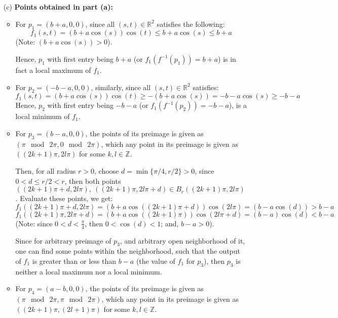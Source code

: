 \documentclass{article}
\begin{document}
\begin{itemize}
    \hfil

    \item[(c)] \textbf{Points obtained in part (a):}
    \begin{itemize}
        \item For $p_1=(b+a,0,0)$, since all $(s,t)\in\mathbb{R}^2$ satisfies the following:
        $$f_1(s,t)=(b+a\cos(s))\cos(t) \leq b+a\cos(s) \leq b+a$$
        (Note: $(b+a\cos(s))>0$).

        Hence, $p_1$ with first entry being $b+a$ (or $f_1(f^{-1}(p_1))=b+a$) is in fact a local maximum of $f_1$.

        \hfil

        \item For $p_2=(-b-a,0,0)$, similarly, since all $(s,t)\in\mathbb{R}^2$ satisfies:
        $$f_1(s,t)=(b+a\cos(s))\cos(t) \geq -(b+a\cos(s)) = -b-a\cos(s) \geq -b-a$$
        Hence, $p_2$ with first entry being $-b-a$ (or $f_1(f^{-1}(p_2)) = -b-a$), is a local minimum of $f_1$.

        \hfil

        \item For $p_3 = (b-a,0,0)$, the points of its preimage is given as $(\pi\mod\ 2\pi, 0\mod\ 2\pi)$, 
        which any point in its preimage is given as $((2k+1)\pi, 2l\pi)$ for some $k,l\in\mathbb{Z}$.

        Then, for all radius $r>0$, choose $d=\min\{\pi/4, r/2\}>0$, since $0<d\leq r/2<r$, then both points $((2k+1)\pi+d, 2l\pi),\ ((2k+1)\pi, 2l\pi+d)\in B_r((2k+1)\pi, 2l\pi)$.
        Evaluate these points, we get:
        $$f_1((2k+1)\pi+d, 2l\pi) =(b+a\cos((2k+1)\pi+d))\cos(2l\pi) = (b-a\cos(d)) > b-a$$
        $$f_1((2k+1)\pi, 2l\pi+d)=(b+a\cos((2k+1)\pi))\cos(2l\pi +d) = (b-a)\cos(d) < b-a$$
        (Note: since $0<d<\frac{\pi}{4}$, then $ 0<\cos(d)<1$; and, $b-a>0$).

        Since for arbitrary preimage of $p_3$, and arbitrary open neighborhood of it, one can find some points within the neighborhood, such that the output of $f_1$ is greater than or less than $b-a$ (the value of $f_1$ for $p_3$),
        then $p_3$ is neither a local maximum nor a local minimum.

        \hfil

        \item For $p_4=(a-b,0,0)$, the points of its preimage is given as $(\pi\mod\ 2\pi, \pi\mod\ 2\pi)$, 
        which any point in its preimage is given as $((2k+1)\pi, (2l+1)\pi)$ for some $k,l\in\mathbb{Z}$.


\end{itemize}
\end{itemize}
\end{document}
